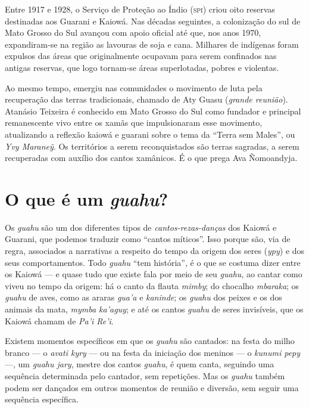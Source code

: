 Entre 1917 e 1928, o Serviço de Proteção ao Índio (\textsc{spi}) criou oito
reservas destinadas aos Guarani e Kaiowá. Nas décadas seguintes, a
colonização do sul de Mato Grosso do Sul avançou com apoio oficial até
que, nos anos 1970, expandiram-se na região as lavouras de soja e cana.
Milhares de indígenas foram expulsos das áreas que originalmente ocupavam
para serem confinados nas antigas reservas, que logo tornam-se áreas
superlotadas, pobres e violentas.

Ao mesmo tempo, emergiu nas comunidades o movimento de luta pela
recuperação das terras tradicionais, chamado de Aty Guasu (\textit{grande
reunião}). Atanásio Teixeira é conhecido em Mato Grosso do Sul como
fundador e principal remanescente vivo entre os xamãs que impulsionaram
esse movimento, atualizando a reflexão kaiowá e guarani sobre o tema da
``Terra sem Males'', ou \textit{Yvy Maraneỹ}. Os territórios a serem
reconquistados são terras sagradas, a serem recuperadas com auxílio dos
cantos xamânicos. É o que prega Ava Ñomoandyja.

\section{O que é um \textit{guahu}?}

Os \textit{guahu} são um dos diferentes tipos de \textit{cantos-rezas-danças} dos
Kaiowá e Guarani, que podemos traduzir como ``cantos míticos''. Isso porque são, via de regra, associados a
narrativas a respeito do tempo da origem dos seres (\textit{ypy}) e dos
seus comportamentos. Todo \textit{guahu} ``tem história'', é o que se
costuma dizer entre os Kaiowá --- e quase tudo que existe fala por meio de
seu \textit{guahu}, ao cantar como viveu no tempo da origem: há o canto da
flauta \textit{mimby}; do chocalho \textit{mbaraka}; os \textit{guahu} de
aves, como as araras \textit{gua'a} e \textit{kaninde}; os \textit{guahu} dos
peixes e os dos animais da mata, \textit{mymba ka'aguy}; e até os cantos
\textit{guahu} de seres invisíveis, que os Kaiowá chamam de \textit{Pa'i
Re'i}.

Existem momentos específicos em que os \textit{guahu} são cantados: na
festa do milho branco --- o \textit{avati kyry} --- ou na festa da iniciação
dos meninos --- o \textit{kunumi pepy} ---, um \textit{guahu jary}, mestre dos
cantos \textit{guahu}, é quem canta, seguindo uma sequência determinada
pelo cantador, sem repetições. Mas os \textit{guahu} também podem ser
dançados em outros momentos de reunião e diversão, sem seguir uma
sequência específica.

